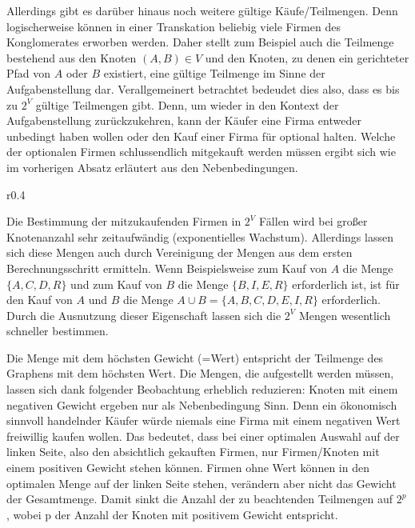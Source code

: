 Allerdings gibt es darüber hinaus noch weitere gültige Käufe/Teilmengen. Denn logischerweise können in einer Transkation beliebig viele Firmen des Konglomerates erworben werden. Daher stellt zum Beispiel auch die Teilmenge bestehend aus den Knoten \((A, B) \in V\) und den Knoten, zu denen ein gerichteter Pfad von \(A\) oder \(B\) existiert, eine gültige Teilmenge im Sinne der Aufgabenstellung dar. Verallgemeinert betrachtet bedeudet dies also, dass es bis zu \(2^V\) gültige Teilmengen gibt. Denn, um wieder in den Kontext der Aufgabenstellung zurückzukehren, kann der Käufer eine Firma entweder unbedingt haben wollen oder den Kauf einer Firma für optional halten. Welche der optionalen Firmen schlussendlich mitgekauft werden müssen ergibt sich wie im vorherigen Absatz erläutert aus den Nebenbedingungen.

\begin{wrapfigure}{r}{0.4\textwidth}
  \begin{center}
    
  \end{center}
\end{wrapfigure}


Die Bestimmung der mitzukaufenden Firmen in \(2^V\) Fällen wird bei großer Knotenanzahl sehr zeitaufwändig (exponentielles Wachstum). Allerdings lassen sich diese Mengen auch durch Vereinigung der Mengen aus dem ersten Berechnungsschritt ermitteln. Wenn Beispielsweise zum Kauf von \(A\) die Menge \(\{A, C, D, R\}\) und zum Kauf von \(B\) die Menge \(\{B, I, E, R\}\) erforderlich ist, ist für den Kauf von \(A\) und \(B\) die Menge \(A \cup B = \{A, B, C, D, E, I, R\}\) erforderlich. Durch die Ausnutzung dieser Eigenschaft lassen sich die \(2^V\) Mengen wesentlich schneller bestimmen.

Die Menge mit dem höchsten Gewicht (=Wert) entspricht der Teilmenge des Graphens mit dem höchsten Wert.
Die Mengen, die aufgestellt werden müssen, lassen sich dank folgender Beobachtung erheblich reduzieren:
Knoten mit einem negativen Gewicht ergeben nur als Nebenbedingung Sinn. Denn ein ökonomisch sinnvoll handelnder Käufer würde niemals eine Firma mit einem negativen Wert freiwillig kaufen wollen. Das bedeutet, dass bei einer optimalen Auswahl auf der linken Seite, also den absichtlich gekauften Firmen, nur Firmen/Knoten mit einem positiven Gewicht stehen können. Firmen ohne Wert können in den optimalen Menge auf der linken Seite stehen, verändern aber nicht das Gewicht der Gesamtmenge. Damit sinkt die Anzahl der zu beachtenden Teilmengen auf \(2^p\), wobei p der Anzahl der Knoten mit positivem Gewicht entspricht.

